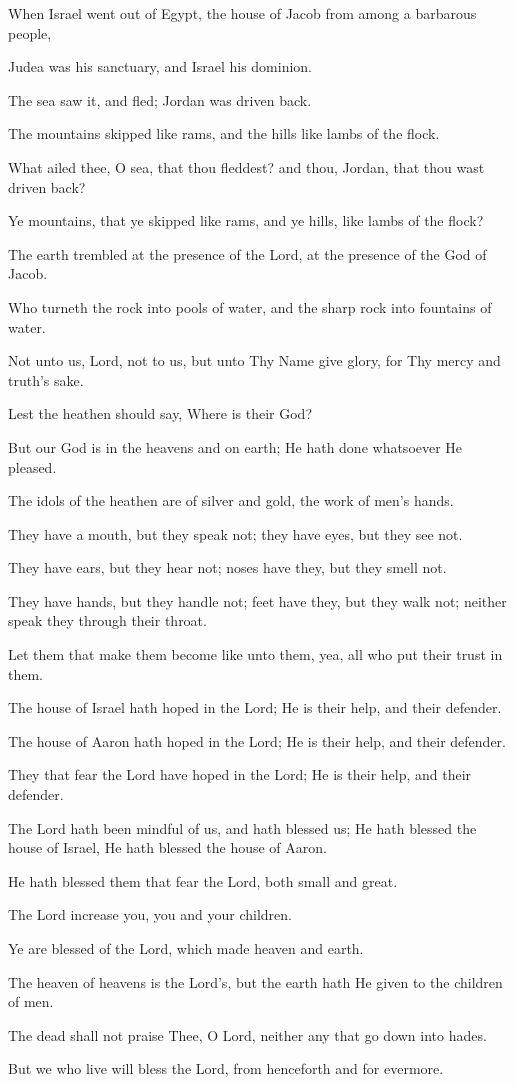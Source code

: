 When Israel went out of Egypt, the house of Jacob from among a barbarous people,

Judea was his sanctuary, and Israel his dominion.

The sea saw it, and fled; Jordan was driven back.

The mountains skipped like rams, and the hills like lambs of the flock.

What ailed thee, O sea, that thou fleddest? and thou, Jordan, that thou wast driven back?

Ye mountains, that ye skipped like rams, and ye hills, like lambs of the flock?

The earth trembled at the presence of the Lord, at the presence of the God of Jacob.

Who turneth the rock into pools of water, and the sharp rock into fountains of water.

Not unto us, Lord, not to us, but unto Thy Name give glory, for Thy mercy and truth’s sake.

Lest the heathen should say, Where is their God?

But our God is in the heavens and on earth; He hath done whatsoever He pleased.

The idols of the heathen are of silver and gold, the work of men’s hands.

They have a mouth, but they speak not; they have eyes, but they see not.

They have ears, but they hear not; noses have they, but they smell not.

They have hands, but they handle not; feet have they, but they walk not; neither speak they through their throat.

Let them that make them become like unto them, yea, all who put their trust in them.

The house of Israel hath hoped in the Lord; He is their help, and their defender.

The house of Aaron hath hoped in the Lord; He is their help, and their defender.

They that fear the Lord have hoped in the Lord; He is their help, and their defender.

The Lord hath been mindful of us, and hath blessed us; He hath blessed the house of Israel, He hath blessed the house of Aaron.

He hath blessed them that fear the Lord, both small and great.

The Lord increase you, you and your children.

Ye are blessed of the Lord, which made heaven and earth.

The heaven of heavens is the Lord's, but the earth hath He given to the children of men.

The dead shall not praise Thee, O Lord, neither any that go down into hades.

But we who live will bless the Lord, from henceforth and for evermore.
